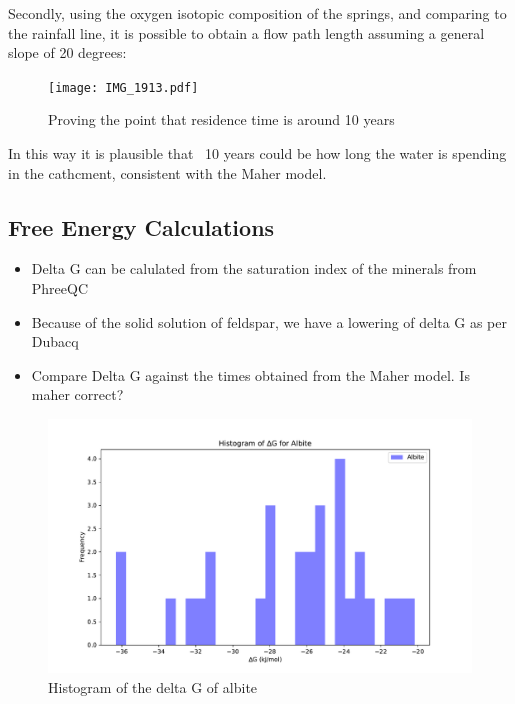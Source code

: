 \bsk

Secondly, using the oxygen isotopic composition of the springs, and comparing to the rainfall line, it is possible to obtain a flow path length assuming a general slope of 20 degrees:



\begin{figure}[h]
    \centering
    \texttt{[image: IMG\_1913.pdf]}
    \caption{Proving the point that residence time is around 10 years}
    \label{fig:discussion7}
\end{figure}

\FloatBarrier




In this way it is plausible that ~10 years could be how long the water is spending in the cathcment, consistent with the Maher model.




\subsection{Free Energy Calculations}

\begin{itemize}
    \item Delta G can be calulated from the saturation index of the minerals from PhreeQC
    \item Because of the solid solution of feldspar, we have a lowering of delta G as per Dubacq
    \item Compare Delta G against the times obtained from the Maher model. Is maher correct?

\end{itemize}

\begin{figure}[h]
    \centering
    \includegraphics[width=\textwidth]{Albite_histogram.pdf}
    \caption{Histogram of the delta G of albite}
    \label{fig:discussion8}
\end{figure}


